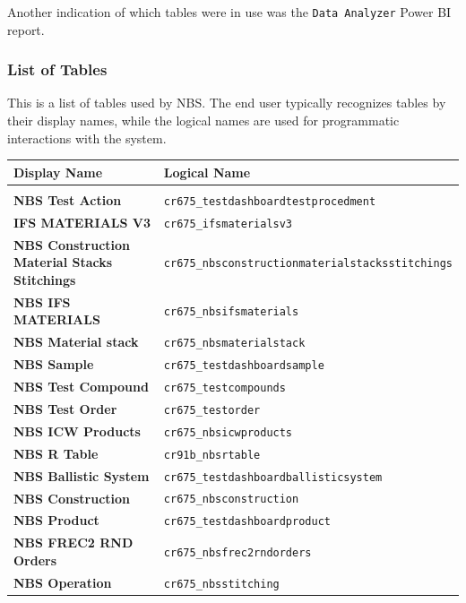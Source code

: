Another indication of which tables were in use was the \texttt{Data Analyzer} Power BI report.

\newpage

\subsubsection{List of Tables}

This is a list of tables used by NBS. The end user typically recognizes tables by their display names, while the logical names are used for programmatic interactions with the system.

\begin{footnotesize}
	\begin{tabularx}{\textwidth}{l|l}
		\textbf{Display Name} & \textbf{Logical Name} \\\hline\\
		\textbf{NBS Test Action} & \texttt{cr675\_testdashboardtestprocedment} \\[0.5em]
		\textbf{IFS MATERIALS V3} & \texttt{cr675\_ifsmaterialsv3} \\[0.5em]
		\textbf{NBS Construction Material Stacks Stitchings} & \texttt{cr675\_nbsconstructionmaterialstacksstitchings} \\[0.5em]
		\textbf{NBS IFS MATERIALS} & \texttt{cr675\_nbsifsmaterials} \\[0.5em]
		\textbf{NBS Material stack} & \texttt{cr675\_nbsmaterialstack} \\[0.5em]
		\textbf{NBS Sample} & \texttt{cr675\_testdashboardsample} \\[0.5em]
		\textbf{NBS Test Compound} & \texttt{cr675\_testcompounds} \\[0.5em]
		\textbf{NBS Test Order} & \texttt{cr675\_testorder} \\[0.5em]
		\textbf{NBS ICW Products} & \texttt{cr675\_nbsicwproducts} \\[0.5em]
		\textbf{NBS R Table} & \texttt{cr91b\_nbsrtable} \\[0.5em]
		\textbf{NBS Ballistic System} & \texttt{cr675\_testdashboardballisticsystem} \\[0.5em]
		\textbf{NBS Construction} & \texttt{cr675\_nbsconstruction} \\[0.5em]
		\textbf{NBS Product} & \texttt{cr675\_testdashboardproduct} \\[0.5em]
		\textbf{NBS FREC2 RND Orders} & \texttt{cr675\_nbsfrec2rndorders} \\[0.5em]
		\textbf{NBS Operation} & \texttt{cr675\_nbsstitching} \\[0.5em]

\end{tabularx}
\end{footnotesize}
